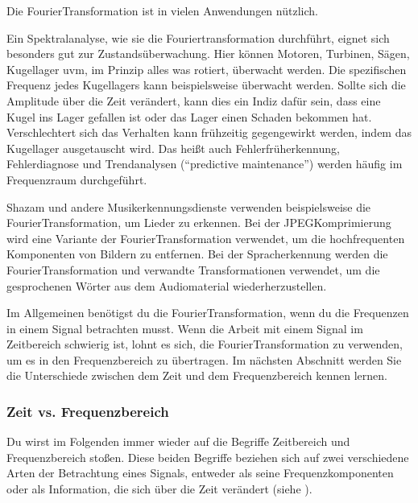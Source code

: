 \documentclass[letterpaper,10pt,english]{jupyterBook}
\begin{document}
\sphinxAtStartPar
Die Fourier\sphinxhyphen{}Transformation ist in vielen Anwendungen nützlich.

\sphinxAtStartPar
Ein Spektralanalyse, wie sie die Fouriertransformation durchführt, eignet sich besonders gut zur Zustandsüberwachung. Hier können Motoren, Turbinen, Sägen, Kugellager uvm, im Prinzip alles was rotiert, überwacht werden. Die spezifischen Frequenz jedes Kugellagers kann beispielsweise überwacht werden. Sollte sich die Amplitude über die Zeit verändert, kann dies ein Indiz dafür sein, dass eine Kugel ins Lager gefallen ist oder das Lager einen Schaden bekommen hat. Verschlechtert sich das Verhalten kann frühzeitig gegengewirkt werden, indem das Kugellager ausgetauscht wird. Das heißt auch Fehlerfrüherkennung, Fehlerdiagnose und Trendanalysen (“predictive maintenance”) werden häufig im Frequenzraum durchgeführt.

\sphinxAtStartPar
Shazam und andere Musikerkennungsdienste verwenden beispielsweise die Fourier\sphinxhyphen{}Transformation, um Lieder zu erkennen. Bei der JPEG\sphinxhyphen{}Komprimierung wird eine Variante der Fourier\sphinxhyphen{}Transformation verwendet, um die hochfrequenten Komponenten von Bildern zu entfernen. Bei der Spracherkennung werden die Fourier\sphinxhyphen{}Transformation und verwandte Transformationen verwendet, um die gesprochenen Wörter aus dem Audiomaterial wiederherzustellen.

\sphinxAtStartPar
Im Allgemeinen benötigst du die Fourier\sphinxhyphen{}Transformation, wenn du die Frequenzen in einem Signal betrachten musst. Wenn die Arbeit mit einem Signal im Zeitbereich schwierig ist, lohnt es sich, die Fourier\sphinxhyphen{}Transformation zu verwenden, um es in den Frequenzbereich zu übertragen. Im nächsten Abschnitt werden Sie die Unterschiede zwischen dem Zeit\sphinxhyphen{} und dem Frequenzbereich kennen lernen.


\subsubsection{Zeit\sphinxhyphen{} vs. Frequenzbereich}
\label{\detokenize{content/3_FourierAnalyse:zeit-vs-frequenzbereich}}
\sphinxAtStartPar
Du wirst im Folgenden immer wieder auf die Begriffe Zeitbereich und Frequenzbereich stoßen. Diese beiden Begriffe beziehen sich auf zwei verschiedene Arten der Betrachtung eines Signals, entweder als seine Frequenzkomponenten oder als Information, die sich über die Zeit verändert (siehe {\hyperref[\detokenize{content/3_Messsignale::doc}]{}}).
\end{document}
